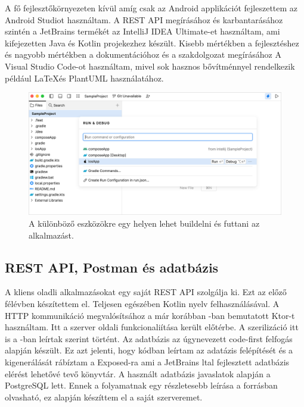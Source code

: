 A fő fejlesztőkörnyezeten kívül amíg csak az Android applikációt fejleszettem az Android Studiot használtam.
A REST API megírásához és karbantarásához szintén a JetBrains termékét az IntelliJ IDEA Ultimate-et használtam, ami kifejezetten Java és Kotlin projekezhez készült.
Kisebb mértékben a fejlesztéshez és nagyobb mértékben a dokumentációhoz és a szakdolgozat megírásához A Visual Studio Code-ot használtam, mivel sok hasznos bővítménnyel rendelkezik például \LaTeX és PlantUML használatához.


\begin{figure}[!ht]
    \centering
    \includegraphics[width=150mm, keepaspectratio]{figures/fleet-run-configurations.png}
    \caption{A különböző eszközökre egy helyen lehet buildelni és futtani az alkalmazást. \cite{Fleet}}
    \label{fig:RunConfigs}
\end{figure}




\subsection{REST API, Postman és adatbázis}

A kliens oladli alkalmazásokat egy saját REST API szolgálja ki.
Ezt az előző félévben készítettem el. Teljesen egészében Kotlin nyelv felhasználásával. A HTTP kommunikáció megvalósítsához a már korábban -ban bemutatott Ktor-t használtam.
Itt a szerver oldali funkcionaliítása került előtérbe. A szerilizáció itt is a -ban leírtak szerint történt.
Az adatbázis az úgynevezett code-first felfogás alapján készült. Ez azt jelenti, hogy kódban leírtam az adatázis felépítését és a kigenerálását rábíztam a Exposed-ra ami a JetBrains ltal fejlesztett adatbázis elérést lehetővé tevő könyvtár.
A használt adatbázis javaslatok alapján a PostgreSQL lett.
Ennek a folyamatnak egy részletesebb leírása a \cite{Backend} forrásban olvasható, ez alapján készíttem el a saját szerveremet.

